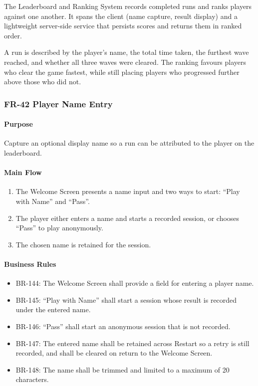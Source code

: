 \documentclass[11pt,a4paper]{article}
\begin{document}
The Leaderboard and Ranking System records completed runs and ranks players
against one another. It spans the client (name capture, result display) and a
lightweight server-side service that persists scores and returns them in ranked
order.

A run is described by the player's name, the total time taken, the furthest wave
reached, and whether all three waves were cleared. The ranking favours players
who clear the game fastest, while still placing players who progressed further
above those who did not.

\subsubsection{FR-42 Player Name Entry}

\paragraph{Purpose}
Capture an optional display name so a run can be attributed to the player on the
leaderboard.

\paragraph{Main Flow}
\begin{enumerate}
  \item The Welcome Screen presents a name input and two ways to start: ``Play
        with Name'' and ``Pass''.
  \item The player either enters a name and starts a recorded session, or chooses
        ``Pass'' to play anonymously.
  \item The chosen name is retained for the session.
\end{enumerate}

\paragraph{Business Rules}
\begin{itemize}
  \item BR-144: The Welcome Screen shall provide a field for entering a player
        name.
  \item BR-145: ``Play with Name'' shall start a session whose result is recorded
        under the entered name.
  \item BR-146: ``Pass'' shall start an anonymous session that is not recorded.
  \item BR-147: The entered name shall be retained across Restart so a retry is
        still recorded, and shall be cleared on return to the Welcome Screen.
  \item BR-148: The name shall be trimmed and limited to a maximum of 20
        characters.
\end{itemize}
\end{document}
